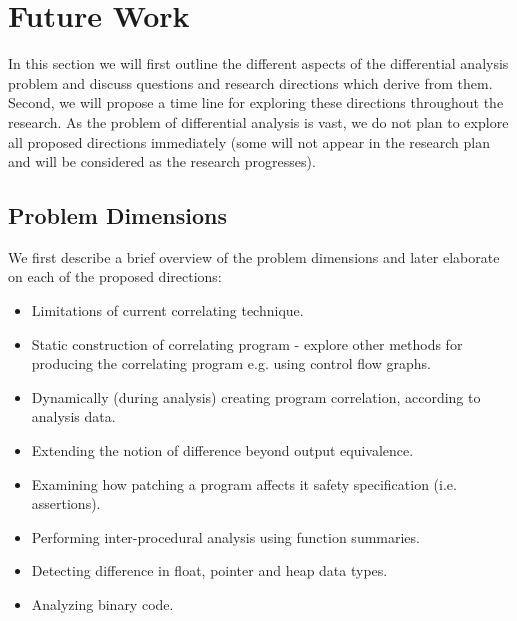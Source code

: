 \section{Future Work}

In this section we will first outline the different aspects of the differential analysis problem and discuss questions and research directions which derive from them. Second, we will propose a time line for exploring these directions throughout the research. As the problem of differential analysis is vast, we do not plan to explore all proposed directions immediately (some will not appear in the research plan and will be considered as the research progresses).

\subsection{Problem Dimensions}

We first describe a brief overview of the problem dimensions and later elaborate on each of the proposed directions:

\begin{itemize}
\item Limitations of current correlating technique.
\item Static construction of correlating program - explore other methods for producing the correlating program e.g. using control flow graphs.
\item Dynamically (during analysis) creating program correlation, according to analysis data.
\end{itemize}

\begin{itemize}
\item Extending the notion of difference beyond output equivalence.
\item Examining how patching a program affects it safety specification (i.e. assertions).
\end{itemize}

\begin{itemize}
\item Performing inter-procedural analysis using function summaries.
\item Detecting difference in float, pointer and heap data types.
\item Analyzing binary code.
\end{itemize}

